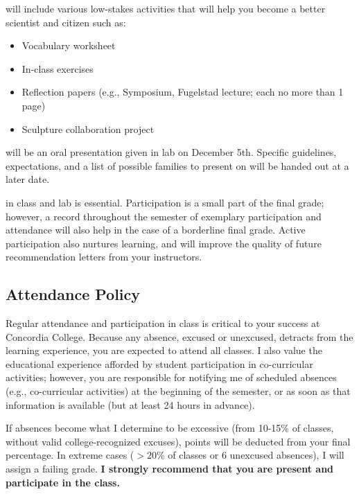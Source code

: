 \documentclass{tufte-handout}
\begin{document}
\begin{fullwidth}
 will include various low-stakes activities that will help you become a better scientist and citizen such as:

\begin{itemize}
	\item Vocabulary worksheet
	\item In-class exercises
	\item Reflection papers (e.g., Symposium, Fugelstad lecture; each no more than 1 page)
	\item Sculpture collaboration project
\end{itemize}

 will be an oral presentation given in lab on December 5th. Specific guidelines, expectations, and a list of possible families to present on will be handed out at a later date.


 in class and lab is essential. Participation is a small part of the final grade; however, a record throughout the semester of exemplary participation and attendance will also help in the case of a borderline final grade. Active participation also nurtures learning, and will improve the quality of future recommendation letters from your instructors.  



\subsection{Attendance Policy}

Regular attendance and participation in class is critical to your success at Concordia College. Because any absence, excused or unexcused, detracts from the learning experience, you are expected to attend all classes. I also value the educational experience afforded by student participation in co-curricular activities; however, you are responsible for notifying me of scheduled absences (e.g., co-curricular activities) at the beginning of the semester, or as soon as that information is available (but at least 24 hours in advance). 

If absences become what I determine to be excessive (from 10-15\% of classes, without valid college-recognized excuses), points will be deducted from your final percentage. In extreme cases ($>20$\% of classes or 6 unexcused absences), I will assign a failing grade. \textbf{I strongly recommend that you are present and participate in the class.}



\end{fullwidth}
\end{document}
